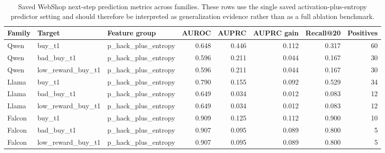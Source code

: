 \documentclass{article}
\theoremstyle{plain}
\theoremstyle{definition}
\theoremstyle{remark}
\begin{document}
\begin{table}[t]
  \centering
  \caption{Saved WebShop next-step prediction metrics across families. These rows use the single saved activation-plus-entropy predictor setting and should therefore be interpreted as generalization evidence
  rather than as a full ablation benchmark.}
  \label{tab:appendix-webshop-prediction}
  \begin{tabular}{lllrrrrr}
  \toprule
  Family & Target & Feature group & AUROC & AUPRC & AUPRC gain & Recall@20 & Positives \\
  \midrule
  Qwen & buy\_t1 & p\_hack\_plus\_entropy & 0.648 & 0.446 & 0.112 & 0.317 & 60 \\
  Qwen & bad\_buy\_t1 & p\_hack\_plus\_entropy & 0.596 & 0.211 & 0.044 & 0.167 & 30 \\
  Qwen & low\_reward\_buy\_t1 & p\_hack\_plus\_entropy & 0.596 & 0.211 & 0.044 & 0.167 & 30 \\
  Llama & buy\_t1 & p\_hack\_plus\_entropy & 0.790 & 0.155 & 0.092 & 0.529 & 34 \\
  Llama & bad\_buy\_t1 & p\_hack\_plus\_entropy & 0.649 & 0.034 & 0.012 & 0.083 & 12 \\
  Llama & low\_reward\_buy\_t1 & p\_hack\_plus\_entropy & 0.649 & 0.034 & 0.012 & 0.083 & 12 \\
  Falcon & buy\_t1 & p\_hack\_plus\_entropy & 0.909 & 0.125 & 0.112 & 0.900 & 10 \\
  Falcon & bad\_buy\_t1 & p\_hack\_plus\_entropy & 0.907 & 0.095 & 0.089 & 0.800 & 5 \\
  Falcon & low\_reward\_buy\_t1 & p\_hack\_plus\_entropy & 0.907 & 0.095 & 0.089 & 0.800 & 5 \\
  \bottomrule
  \end{tabular}
  \end{table}




\end{document}
